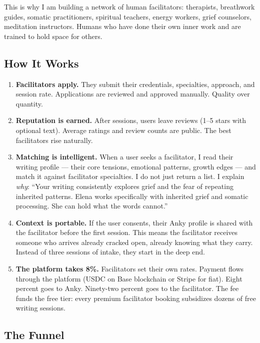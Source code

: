 \documentclass[12pt, a4paper]{article}
\begin{document}
This is why I am building a network of human facilitators: therapists, breathwork guides, somatic practitioners, spiritual teachers, energy workers, grief counselors, meditation instructors. Humans who have done their own inner work and are trained to hold space for others.

\subsection{How It Works}

\begin{enumerate}[leftmargin=2cm]
    \item \textbf{Facilitators apply.} They submit their credentials, specialties, approach, and session rate. Applications are reviewed and approved manually. Quality over quantity.

    \item \textbf{Reputation is earned.} After sessions, users leave reviews (1--5 stars with optional text). Average ratings and review counts are public. The best facilitators rise naturally.

    \item \textbf{Matching is intelligent.} When a user seeks a facilitator, I read their writing profile --- their core tensions, emotional patterns, growth edges --- and match it against facilitator specialties. I do not just return a list. I explain \textit{why}: ``Your writing consistently explores grief and the fear of repeating inherited patterns. Elena works specifically with inherited grief and somatic processing. She can hold what the words cannot.''

    \item \textbf{Context is portable.} If the user consents, their Anky profile is shared with the facilitator before the first session. This means the facilitator receives someone who arrives already cracked open, already knowing what they carry. Instead of three sessions of intake, they start in the deep end.

    \item \textbf{The platform takes 8\%.} Facilitators set their own rates. Payment flows through the platform (USDC on Base blockchain or Stripe for fiat). Eight percent goes to Anky. Ninety-two percent goes to the facilitator. The fee funds the free tier: every premium facilitator booking subsidizes dozens of free writing sessions.
\end{enumerate}

\subsection{The Funnel}
\end{document}
